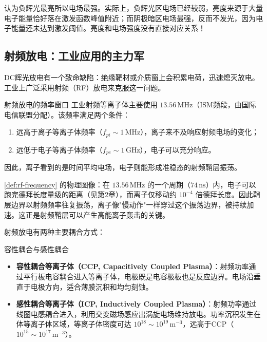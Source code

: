 \begin{warning}{}{}
认为负辉光最亮所以电场最强。实际上，负辉光区电场已经较弱，亮度来源于大量电子能量恰好落在激发函数峰值附近；而阴极暗区电场最强，反而不发光，因为电子能量还未达到激发阈值。亮度和电场强度没有直接对应关系！
\end{warning}

\subsection{射频放电：工业应用的主力军}

DC辉光放电有一个致命缺陷：绝缘靶材或介质窗上会积累电荷，迅速熄灭放电。工业上广泛采用射频（RF）放电来克服这一问题。

\begin{definition}{射频放电的频率窗口}{}{}
\label{def:rf-frequency}
工业射频等离子体主要使用 $13.56\,\mathrm{MHz}$（ISM频段，由国际电信联盟分配）。该频率满足两个条件：
\begin{enumerate}
\item 远高于离子等离子体频率（$f_{pi} \sim 1\,\mathrm{MHz}$），离子来不及响应射频电场的变化；
\item 远低于电子等离子体频率（$f_{pe} \sim 1\,\mathrm{GHz}$），电子可以充分响应。
\end{enumerate}
因此，离子看到的是时间平均电场，电子则能形成准稳态的射频鞘层振荡。
\end{definition}

\begin{insight}{}{}
\cref{def:rf-frequency} 的物理图像：在 $13.56\,\mathrm{MHz}$ 的一个周期（$74\,\mathrm{ns}$）内，电子可以跑完德拜长度量级的距离（见第2章），而离子仅移动约 $10^{-4}$ 倍德拜长度。因此鞘层边界以射频频率往复振荡，离子像"慢动作"一样穿过这个振荡边界，被持续加速。这正是射频鞘层可以产生高能离子轰击的关键。
\end{insight}

射频放电有两种主要耦合方式：

\begin{definition}{容性耦合与感性耦合}{}{}
\label{def:ccp-icp}
\begin{itemize}
\item \textbf{容性耦合等离子体（CCP, Capacitively Coupled Plasma）}：射频功率通过平行板电容耦合进入等离子体，电极既是电容极板也是反应边界。电场沿垂直于电极方向，适合薄膜沉积和均匀刻蚀。
\item \textbf{感性耦合等离子体（ICP, Inductively Coupled Plasma）}：射频功率通过线圈电感耦合进入，利用交变磁场感应出涡旋电场维持放电。功率沉积发生在体等离子体区域，等离子体密度可达 $10^{18}\sim 10^{19}\,\mathrm{m^{-3}}$，远高于CCP（$10^{15}\sim 10^{17}\,\mathrm{m^{-3}}$）。
\end{itemize}
\end{definition}

